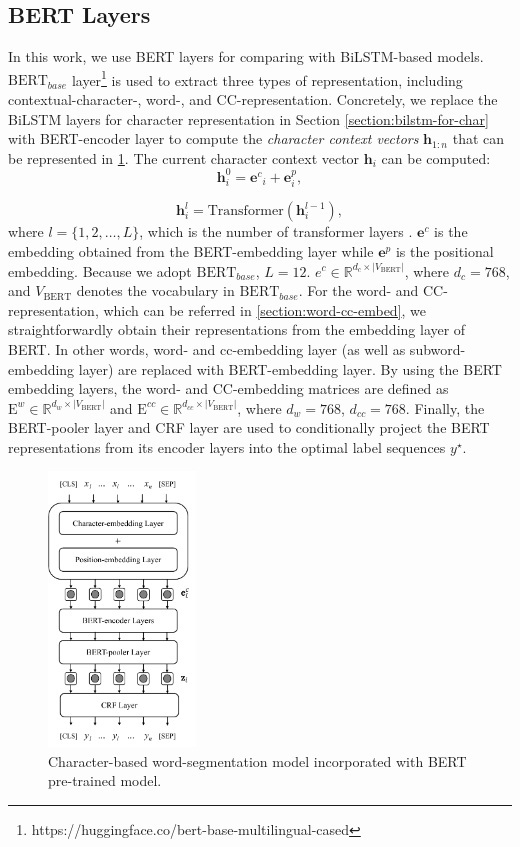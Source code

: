 \subsection{BERT Layers}
In this work, we use BERT layers for comparing with BiLSTM-based models. 
%
$\text{BERT}_{base}$ layer\footnote{https://huggingface.co/bert-base-multilingual-cased} is used to extract three types of representation, including contextual-character-, word-, and CC-representation.
%
Concretely, we replace the BiLSTM layers for character representation in Section \ref{section:bilstm-for-char} with BERT-encoder layer to compute the \textit{character context vectors} $\textbf{h}_{1:n}$ that can be represented in \ref{fig:bert-model}. 
%
The current character context vector $\textbf{h}_{i}$ can be computed: 
\begin{equation}
    \textbf{h}_{i}^{0} = {\textbf{e}^{c}}_{i} + {\textbf{e}^{p}_{i}},
\end{equation}

\begin{equation}
    \textbf{h}_{i}^{l} = \text{Transformer}(\textbf{h}_{i}^{l-1}),
\end{equation}
%
where $l = \{1, 2, \dots, L\}$, which is the number of transformer layers \cite{Vaswani2017}. $\textbf{e}^{c}$ is the embedding obtained from the BERT-embedding layer while $\textbf{e}^{p}$ is the positional embedding.
%
Because we adopt $\text{BERT}_{base}$, $L=12$. $e^{c} \in \mathbb{R}^{d_{c} \times |V_{\text{BERT}}|}$, where $d_{c} = 768$, and $V_{\text{BERT}}$ denotes the vocabulary in $\text{BERT}_{base}$.
%
For the word- and CC-representation, which can be referred in \ref{section:word-cc-embed}, we straightforwardly obtain their representations from the embedding layer of BERT. 
%
In other words, word- and cc-embedding layer (as well as subword-embedding layer) are replaced with BERT-embedding layer.
%
By using the BERT embedding layers, the word- and CC-embedding matrices are defined as $\text{E}^{w} \in \mathbb{R}^{d_{w} \times |V_{\text{BERT}}|}$ and $\text{E}^{cc} \in \mathbb{R}^{d_{cc} \times |V_{\text{BERT}}|}$, where $d_{w}=768$, $d_{cc}=768$.
%
Finally, the BERT-pooler layer and CRF layer are used to conditionally project the BERT representations from its encoder layers into the optimal label sequences $y^{\star}$.

\begin{figure}[ht]
    \centering
    \includegraphics[width=0.35\textwidth]{figures/fig-bert-ext-model.pdf}
    \caption{Character-based word-segmentation model incorporated with BERT pre-trained model.}
    \label{fig:bert-model}
\end{figure}